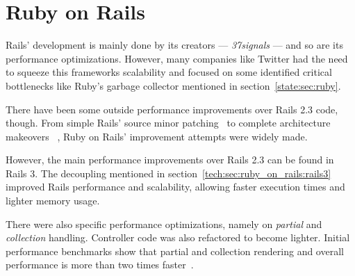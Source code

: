 \section{Ruby on Rails} %
\label{state:sec:ruby_on_rails}
Rails' development is mainly done by its creators --- \textit{37signals} --- and so are its performance optimizations. However, many companies like Twitter had the need to squeeze this frameworks scalability and focused on some identified critical bottlenecks like Ruby's garbage collector mentioned in section~\ref{state:sec:ruby}.

There have been some outside performance improvements over Rails 2.3 code, though. From simple Rails' source minor patching~\cite{accunote_rails} to complete architecture makeovers ~\cite{distributed_rails}, Ruby on Rails' improvement attempts were widely made.

However, the main performance improvements over Rails 2.3 can be found in Rails 3. The decoupling mentioned in section~\ref{tech:sec:ruby_on_rails:rails3} improved Rails performance and scalability, allowing faster execution times and lighter memory usage.

There were also specific performance optimizations, namely on \textit{partial} and \textit{collection} handling. Controller code was also refactored to become lighter. Initial performance benchmarks show that partial and collection rendering and overall performance is more than two times faster~\cite{rails_merb_merge_performance, vaporware_to_awesome}.

